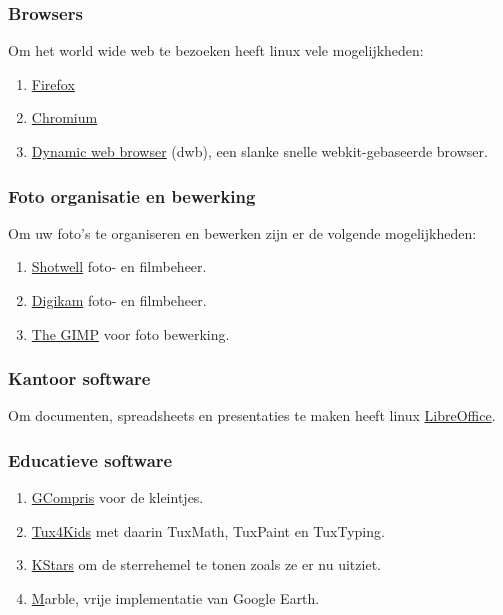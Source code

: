 \subsubsection{Browsers}
Om het world wide web te bezoeken heeft linux vele mogelijkheden:

\begin{enumerate}
	\item \href{https://www.mozilla.org/nl/firefox/new/}{Firefox}
	\item \href{http://www.chromium.org/}{Chromium}
	\item \href{http://portix.bitbucket.org/dwb/}{Dynamic web browser} (dwb), een slanke snelle webkit-gebaseerde browser.
\end{enumerate}

\subsubsection{Foto organisatie en bewerking}
Om uw foto's te organiseren en bewerken zijn er de volgende mogelijkheden:

\begin{enumerate}
	\item \href{https://wiki.gnome.org/Apps/Shotwell}{Shotwell} foto- en filmbeheer.
	\item \href{https://www.digikam.org/}{Digikam}  foto- en filmbeheer.
	\item \href{http://www.gimp.org/}{The GIMP} voor foto bewerking.
\end{enumerate}

\subsubsection{Kantoor software}
Om documenten, spreadsheets en presentaties te maken heeft linux \href{https://www.libreoffice.org/}{LibreOffice}.

\subsubsection{Educatieve software}
\begin{enumerate}
	\item \href{http://gcompris.net/index-en.html}{GCompris} voor de kleintjes.
	\item \href{http://tux4kids.alioth.debian.org/}{Tux4Kids} met daarin TuxMath, TuxPaint en TuxTyping.
	\item \href{https://edu.kde.org/kstars/}{KStars} om de sterrehemel te tonen zoals ze er nu uitziet.
	\item \href{https://edu.kde.org/marble/} Marble, vrije implementatie van Google Earth.
\end{enumerate}

